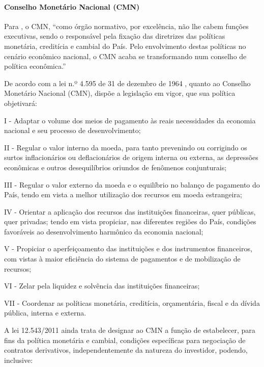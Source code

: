 \documentclass[]{article}
\let\oldparagraph\paragraph
\renewcommand{\paragraph}[1]{\oldparagraph{#1}\mbox{}}
\begin{document}
\paragraph{Conselho Monetário Nacional
(CMN)}\label{conselho-monetario-nacional-cmn}

Para , o CMN, ``como órgão normativo, por
excelência, não lhe cabem funções executivas, sendo o responsável pela
fixação das diretrizes das políticas monetária, creditícia e cambial do
País. Pelo envolvimento destas políticas no cenário econômico nacional,
o CMN acaba se transformando num conselho de política econômica.''

De acordo com a lei n.º 4.595 de 31 de dezembro de 1964
\cite[art. 3º]{brasil1964c}, quanto ao Conselho Monetário Nacional
(CMN), dispõe a legislação em vigor, que sua política objetivará:

I - Adaptar o volume dos meios de pagamento às reais necessidades da
economia nacional e seu processo de desenvolvimento;

II - Regular o valor interno da moeda, para tanto prevenindo ou
corrigindo os surtos inflacionários ou deflacionários de origem interna
ou externa, as depressões econômicas e outros desequilíbrios oriundos de
fenômenos conjunturais;

III - Regular o valor externo da moeda e o equilíbrio no balanço de
pagamento do País, tendo em vista a melhor utilização dos recursos em
moeda estrangeira;

IV - Orientar a aplicação dos recursos das instituições financeiras,
quer públicas, quer privadas; tendo em vista propiciar, nas diferentes
regiões do País, condições favoráveis ao desenvolvimento harmônico da
economia nacional;

V - Propiciar o aperfeiçoamento das instituições e dos instrumentos
financeiros, com vistas à maior eficiência do sistema de pagamentos e de
mobilização de recursos;

VI - Zelar pela liquidez e solvência das instituições financeiras;

VII - Coordenar as políticas monetária, creditícia, orçamentária, fiscal
e da dívida pública, interna e externa.

A lei 12.543/2011 \cite[art. 1º]{brasil2011} ainda trata de designar ao
CMN a função de estabelecer, para fins da política monetária e cambial,
condições específicas para negociação de contratos derivativos,
independentemente da natureza do investidor, podendo, inclusive:
\end{document}
